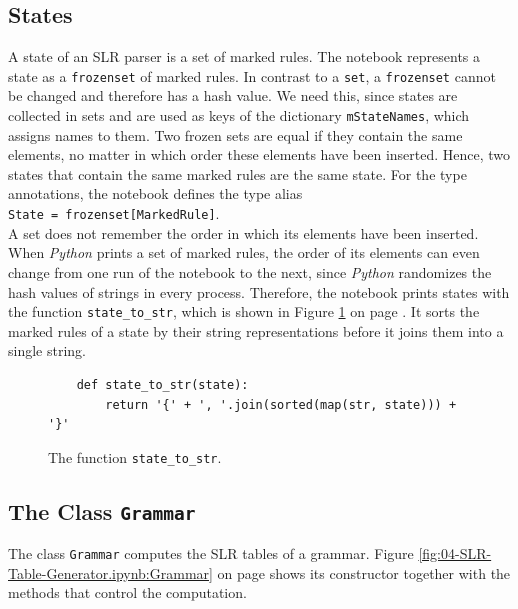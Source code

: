 \subsection{States}
A state of an SLR parser is a set of marked rules.  The notebook represents a state as a \texttt{frozenset} of
marked rules.  In contrast to a \texttt{set}, a \texttt{frozenset} cannot be changed and therefore has a hash value.
We need this, since states are collected in sets and are used as keys of the dictionary \texttt{mStateNames}, which
assigns names to them.  Two frozen sets are equal if they contain the same elements, no matter in which order these
elements have been inserted.  Hence, two states that contain the same marked rules are the same state.  For the type
annotations, the notebook defines the type alias
\\[0.2cm]
\hspace*{1.3cm}
\texttt{State = frozenset[MarkedRule]}.
\\[0.2cm]
A set does not remember the order in which its elements have been inserted.  When \textsl{Python} prints a set of
marked rules, the order of its elements can even change from one run of the notebook to the next, since
\textsl{Python} randomizes the hash values of strings in every process.  Therefore, the notebook prints states with
the function \texttt{state\_to\_str}, which is shown in Figure \ref{fig:04-SLR-Table-Generator.ipynb:state_to_str} on
page \pageref{fig:04-SLR-Table-Generator.ipynb:state_to_str}.  It sorts the marked rules of a state by their string
representations before it joins them into a single string.

\begin{figure}[!ht]
\centering
\begin{verbatim}
    def state_to_str(state):
        return '{' + ', '.join(sorted(map(str, state))) + '}'
\end{verbatim}
\vspace*{-0.3cm}
\caption{The function \texttt{state\_to\_str}.}
\label{fig:04-SLR-Table-Generator.ipynb:state_to_str}
\end{figure}

\subsection{The Class \texttt{Grammar}}
The class \texttt{Grammar} computes the SLR tables of a grammar.  Figure \ref{fig:04-SLR-Table-Generator.ipynb:Grammar}
on page \pageref{fig:04-SLR-Table-Generator.ipynb:Grammar} shows its constructor together with the methods that
control the computation.

